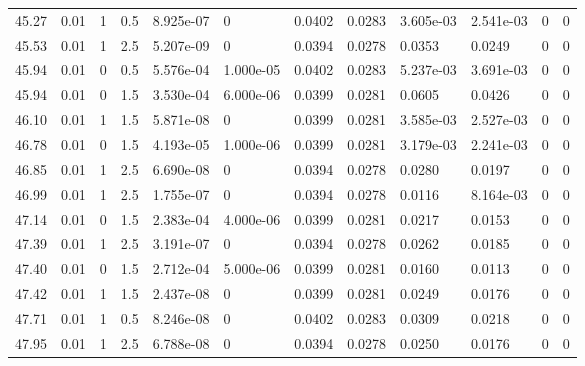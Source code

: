 \documentclass[preview]{standalone}
\begin{document}
{{{{{{\begin{tabular}{L{1.2cm}C{1.2cm} C{0.3cm}C{0.5cm} C{1.4cm}C{1.4cm} C{1.4cm}C{1.4cm} C{1.6cm}C{1.6cm} C{1.6cm}C{1.6cm}}
  45.27  &  0.01  & 1     & 0.5 &  8.925e-07  & 0  &  0.0402&   0.0283& 3.605e-03 & 2.541e-03   &  0 & 0  \\ 
  45.53  &  0.01  & 1     & 2.5 &  5.207e-09  & 0  &  0.0394&   0.0278& 0.0353 & 0.0249   &  0 & 0  \\ 
  45.94  &  0.01  & 0     & 0.5 &  5.576e-04  & 1.000e-05  &  0.0402&   0.0283& 5.237e-03 & 3.691e-03   &  0 & 0  \\ 
  45.94  &  0.01  & 0     & 1.5 &  3.530e-04  & 6.000e-06  &  0.0399&   0.0281& 0.0605 & 0.0426   &  0 & 0  \\ 
  46.10  &  0.01  & 1     & 1.5 &  5.871e-08  & 0  &  0.0399&   0.0281& 3.585e-03 & 2.527e-03   &  0 & 0  \\ 
  46.78  &  0.01  & 0     & 1.5 &  4.193e-05  & 1.000e-06  &  0.0399&   0.0281& 3.179e-03 & 2.241e-03   &  0 & 0  \\ 
  46.85  &  0.01  & 1     & 2.5 &  6.690e-08  & 0  &  0.0394&   0.0278& 0.0280 & 0.0197   &  0 & 0  \\ 
  46.99  &  0.01  & 1     & 2.5 &  1.755e-07  & 0  &  0.0394&   0.0278& 0.0116 & 8.164e-03   &  0 & 0  \\ 
  47.14  &  0.01  & 0     & 1.5 &  2.383e-04  & 4.000e-06  &  0.0399&   0.0281& 0.0217 & 0.0153   &  0 & 0  \\ 
  47.39  &  0.01  & 1     & 2.5 &  3.191e-07  & 0  &  0.0394&   0.0278& 0.0262 & 0.0185   &  0 & 0  \\ 
  47.40  &  0.01  & 0     & 1.5 &  2.712e-04  & 5.000e-06  &  0.0399&   0.0281& 0.0160 & 0.0113   &  0 & 0  \\ 
  47.42  &  0.01  & 1     & 1.5 &  2.437e-08  & 0  &  0.0399&   0.0281& 0.0249 & 0.0176   &  0 & 0  \\ 
  47.71  &  0.01  & 1     & 0.5 &  8.246e-08  & 0  &  0.0402&   0.0283& 0.0309 & 0.0218   &  0 & 0  \\ 
  47.95  &  0.01  & 1     & 2.5 &  6.788e-08  & 0  &  0.0394&   0.0278& 0.0250 & 0.0176   &  0 & 0  \\ 
\hline 
\end{tabular} 

}}}}}}
\end{document}
